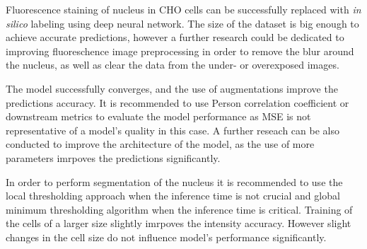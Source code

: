 Fluorescence staining of nucleus in CHO cells can be successfully replaced with \textit{in silico} labeling using deep neural network. The size of the dataset is big enough to achieve accurate predictions, however a further research could be dedicated to improving fluoreschence image preprocessing in order to remove the blur around the nucleus, as well as clear the data from the under- or overexposed images. 

The model successfully converges, and the use of augmentations improve the predictions accuracy. It is recommended to use Person correlation coefficient or downstream metrics to evaluate the model performance as MSE is not representative of a model's quality in this case. A further reseach can be also conducted to improve the architecture of the model, as the use of more parameters imrpoves the predictions significantly. 

In order to perform segmentation of the nucleus it is recommended to use the local thresholding approach when the inference time is not crucial and global minimum thresholding algorithm when the inference time is critical. Training of the cells of a larger size slightly imrpoves the intensity accuracy. However slight changes in the cell size do not influence model's performance significantly.